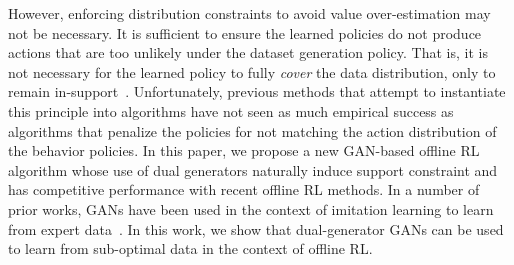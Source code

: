 However, enforcing distribution constraints  to avoid value over-estimation may not be necessary. It is sufficient to ensure the learned policies do not produce actions that are too unlikely under the dataset generation policy. That is, it is not necessary for the learned policy to fully \emph{cover} the data distribution, only to remain in-support~\cite{kumar2019stabilizing,kumar_blog,levine2020offline,brac,zhou2020plas,chen2022latent}. Unfortunately, previous methods that attempt to instantiate this principle into algorithms have not seen as much empirical success as algorithms that penalize the policies for not matching the action distribution of the behavior policies. In this paper, we propose a new GAN-based offline RL algorithm whose use of dual generators naturally induce support constraint and has competitive performance with recent offline RL methods. In a number of prior works, GANs have been used in the context of imitation learning to learn from expert data~\cite{gail,infogail,intentiongan,zhihanliu}. In this work, we show that dual-generator GANs can be used to learn from sub-optimal data in the context of offline RL.

